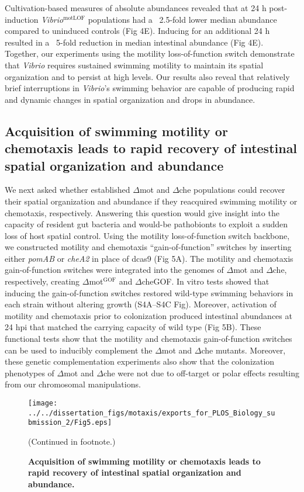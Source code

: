 {{{{Cultivation-based measures of absolute abundances revealed that at 24 h post-induction \textit{Vibrio}$^{\text{motLOF}}$ populations had a ~2.5-fold lower median abundance compared to uninduced controls (Fig 4E). Inducing for an additional 24 h resulted in a ~5-fold reduction in median intestinal abundance (Fig 4E). Together, our experiments using the motility loss-of-function switch demonstrate that \textit{Vibrio} requires sustained swimming motility to maintain its spatial organization and to persist at high levels. Our results also reveal that relatively brief interruptions in \textit{Vibrio}'s swimming behavior are capable of producing rapid and dynamic changes in spatial organization and drops in abundance.


\subsection{Acquisition of swimming motility or chemotaxis leads to rapid recovery of intestinal spatial organization and abundance}
We next asked whether established $\Delta$mot and $\Delta$che populations could recover their spatial organization and abundance if they reacquired swimming motility or chemotaxis, respectively. Answering this question would give insight into the capacity of resident gut bacteria and would-be pathobionts to exploit a sudden loss of host spatial control. Using the motility loss-of-function switch backbone, we constructed motility and chemotaxis ``gain-of-function'' switches by inserting either \textit{pomAB} or \textit{cheA2} in place of dcas9 (Fig 5A). The motility and chemotaxis gain-of-function switches were integrated into the genomes of $\Delta$mot and $\Delta$che, respectively, creating $\Delta$mot$^{\text{GOF}}$ and $\Delta$cheGOF. In vitro tests showed that inducing the gain-of-function switches restored wild-type swimming behaviors in each strain without altering growth (S4A–S4C Fig). Moreover, activation of motility and chemotaxis prior to colonization produced intestinal abundances at 24 hpi that matched the carrying capacity of wild type (Fig 5B). These functional tests show that the motility and chemotaxis gain-of-function switches can be used to inducibly complement the $\Delta$mot and $\Delta$che mutants. Moreover, these genetic complementation experiments also show that the colonization phenotypes of $\Delta$mot and $\Delta$che were not due to off-target or polar effects resulting from our chromosomal manipulations.

\begin{figure}%
	\centerline{
		\texttt{[image: ../../dissertation\_figs/motaxis/exports\_for\_PLOS\_Biology\_submission\_2/Fig5.eps]}}
	\caption{\textbf{Acquisition of swimming motility or chemotaxis leads to rapid recovery of intestinal spatial organization and abundance.}}{(Continued in footnote.)}
	\label{fig:motaxis_fig5}
\end{figure}

}}}}
